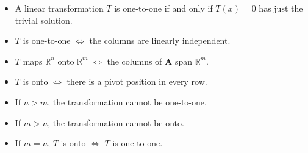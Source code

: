 \documentclass[nobib]{tufte-handout}
\begin{document}
\begin{itemize}
    \item A linear transformation $T$ is one-to-one if and only if $T(x)=0$ has just the trivial solution.
    \item $T$ is one-to-one $\iff$ the columns are linearly independent.
    \item $T$ maps $\mathbb{R}^n$ onto $\mathbb{R}^m$ $\iff$ the columns of \textbf{A} span $\mathbb{R}^m$.
    \item $T$ is onto $\iff$ there is a pivot position in every row.
    \item If $n>m$, the transformation cannot be one-to-one.
    \item If $m>n$, the transformation cannot be onto.
    \item If $m=n$, $T$ is onto $\iff$ $T$ is one-to-one.
\end{itemize}
\end{document}
